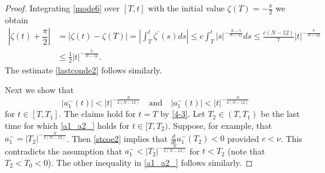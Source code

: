 \documentclass[10pt,a4paper]{amsart}
\begin{document}
\begin{proof}
Integrating \eqref{mode6} over $[T,t]$ with the initial value $\zeta (T)= -\frac{\pi}{2}$ we obtain
\begin{align*}
\left|\zeta (t)+\dfrac{\pi}{2}\right|&= |\zeta (t) - \zeta (T)| =
\left|\int_T^t \zeta^\prime (s) ds\right|\leq c\int_T^t  |s|^{-\frac{N-5}{N-12}} ds \le
 \frac{c(N-12)}{7}|t|^{-\frac{7}{N-12}}\\
& \le\frac{1}{2}|t|^{-\frac{3}{N-12}}. 
\end{align*}
The estimate \eqref{lastconde2} follows similarly.

Next we show that
\begin{equation}\label{a1_a2_}
|a_1^-(t)|<|t|^{-\frac{N}{2(N-12)}}\quad\text{and}\quad
|a_1^-(t)|<|t|^{-\frac{N}{2(N-12)}}
\end{equation}
for $t\in [T,T_1]$. The claims hold for $t=T$ by \eqref{4-3}.
Let $T_2\in (T,T_1)$ be the last time for which \eqref{a1_a2_} holds for $t\in [T,T_2)$. Suppose, for example, that $a_1^-=|T_2|^{-\frac{N}{2(N-12)}}$. 
Then \eqref{stcoe2} implies that $\frac{d}{dt}a_1^-(T_2)<0$ provided $c<\nu$. This contradicts the assumption that $a_1^-<|T_2|^{-\frac{N}{2(N-12)}}$
for $t<T_2$ (note that $T_2<T_0<0$). The other inequality in \eqref{a1_a2_} follows similarly.


\end{proof}
\end{document}

